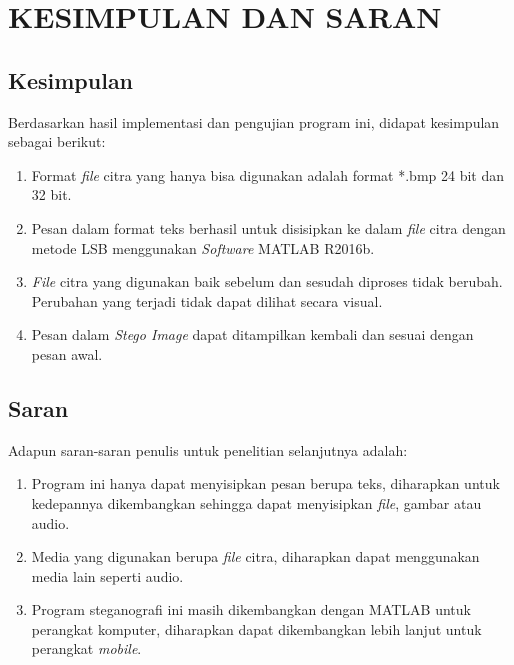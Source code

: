 
\chapter{KESIMPULAN DAN SARAN}

\section{Kesimpulan}
Berdasarkan hasil implementasi dan pengujian program ini, didapat kesimpulan sebagai berikut:

\begin{enumerate}
	\item Format \emph{file} citra yang hanya bisa digunakan adalah format *.bmp 24 bit dan 32 bit.
	
	\item Pesan dalam format teks berhasil untuk disisipkan ke dalam \emph{file} citra dengan metode LSB menggunakan \emph{Software} MATLAB R2016b.
	
	\item \emph{File} citra yang digunakan baik sebelum dan sesudah diproses tidak berubah. Perubahan yang terjadi tidak dapat dilihat secara visual.
	
	\item Pesan dalam \emph{Stego Image} dapat ditampilkan kembali dan sesuai dengan pesan awal.

\end{enumerate}


\section{Saran}
Adapun saran-saran penulis untuk penelitian selanjutnya adalah:
\begin{enumerate}
	\item Program ini hanya dapat menyisipkan pesan berupa teks, diharapkan untuk kedepannya dikembangkan sehingga dapat menyisipkan \emph{file}, gambar atau audio.
	
	\item Media yang digunakan berupa \emph{file} citra, diharapkan dapat menggunakan media lain seperti audio.
	
	\item Program steganografi ini masih dikembangkan dengan MATLAB untuk perangkat komputer, diharapkan dapat dikembangkan lebih lanjut untuk perangkat \emph{mobile}. 
	
\end{enumerate}


\begin{comment}

\end{comment}